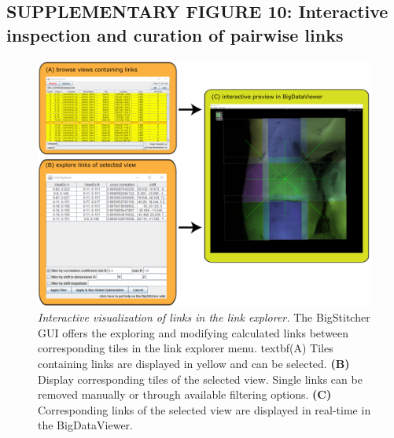 \documentclass[]{spie}  %
\begin{document}
\subsection*{SUPPLEMENTARY FIGURE 10: Interactive inspection and curation of pairwise links}
\vspace{1mm}
\begin{figure}[h!]
\includegraphics[width=\textwidth]{Supp-Link-Explorer.png}
\vspace{-2.0mm}
\caption{\hspace{-0.5mm} \emph{Interactive visualization of links in the link explorer.} The BigStitcher GUI offers the exploring and modifying calculated links between corresponding tiles in the link explorer menu. textbf{(A)} Tiles containing links are displayed in yellow and can be selected. \textbf{(B)} Display corresponding tiles of the selected view. Single links can be removed manually or through available filtering options. \textbf{(C)} Corresponding links of the selected view are displayed in real-time in the BigDataViewer.
}
\label{fig:sup-fig-link-explorer}
\end{figure}

\pagebreak
\end{document}
